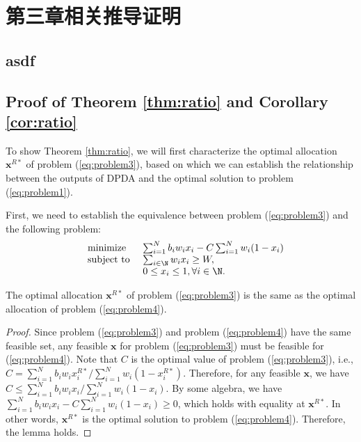 \chapter{第三章相关推导证明}
\section{asdf}

\section{Proof of Theorem \ref{thm:ratio} and Corollary \ref{cor:ratio}}\label{pf:thm:ratio}
To show Theorem \ref{thm:ratio}, we will first characterize the optimal allocation $\mathbf{x}^{R*}$ of problem (\ref{eq:problem3}), based on which we can establish the relationship between the outputs of DPDA and the optimal solution to problem (\ref{eq:problem1}). 
	
	First, we need to establish the equivalence between problem (\ref{eq:problem3}) and the following problem: 
	\begin{equation}%
	\hspace{-0.0cm}
	\begin{array}
	[c]{lll}%
	&{\text{minimize}}&~\sum_{i=1}^{N}b_iw_ix_i-C\sum_{i=1}^{N}w_i(1-x_i)
	\\
	&\text{subject to}&~ \sum_{i\in\N}w_ix_i\ge W,\\
	&&~ 0\le x_i\le 1, \forall i\in\N.
	\end{array}
	\label{eq:problem4}
	\end{equation}
	
	\begin{lm}\label{lm:equivalence}
		The optimal allocation $\mathbf{x}^{R*}$ of problem (\ref{eq:problem3}) is the same as the optimal allocation of problem (\ref{eq:problem4}).
	\end{lm}
	\begin{proof}
		Since problem (\ref{eq:problem3}) and problem (\ref{eq:problem4}) have the same feasible set, any feasible $\mathbf{x}$ for problem (\ref{eq:problem3}) must be feasible for (\ref{eq:problem4}). Note that $C$ is the optimal value of problem (\ref{eq:problem3}), i.e., $C=\sum_{i=1}^{N}b_iw_ix_i^{R*}/\sum_{i=1}^{N}w_i(1-x_i^{R*})$. Therefore, for any feasible $\mathbf{x}$, we have $C\le\sum_{i=1}^{N}b_iw_ix_i/\sum_{i=1}^{N}w_i(1-x_i)$. By some algebra, we have $\sum_{i=1}^{N}b_iw_ix_i-C\sum_{i=1}^{N}w_i(1-x_i)\ge 0$, which holds with equality at $\mathbf{x}^{R*}$. In other words, $\mathbf{x}^{R*}$ is the optimal solution to problem (\ref{eq:problem4}). Therefore, the lemma holds.
	\end{proof}
	
